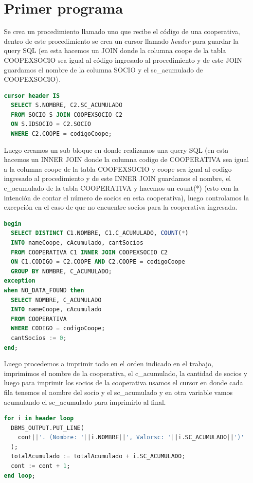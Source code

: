 \documentclass{article}
\begin{document}
\section{Primer programa}

    Se crea un procedimiento llamado uno que recibe el código de una cooperativa, dentro de este procedimiento se crea un cursor llamado \emph{header} para guardar la query SQL (en esta hacemos un JOIN donde la columna coope de la tabla COOPEXSOCIO sea igual al código ingresado al procedimiento y de este JOIN guardamos el nombre de la columna SOCIO y el sc\_acumulado de COOPEXSOCIO).

\begin{lstlisting}[language=SQL,label={lst:lstlisting10}]
cursor header IS
  SELECT S.NOMBRE, C2.SC_ACUMULADO
  FROM SOCIO S JOIN COOPEXSOCIO C2
  ON S.IDSOCIO = C2.SOCIO
  WHERE C2.COOPE = codigoCoope;\end{lstlisting}

  Luego creamos un sub bloque en donde realizamos una query SQL (en esta hacemos un INNER JOIN donde la columna codigo de COOPERATIVA sea igual a la columna coope de la tabla COOPEXSOCIO y coope sea igual al codigo ingresado al procedimiento y de este INNER JOIN guardamos el nombre, el c\_acumulado de la tabla COOPERATIVA y hacemos un count(*) (esto con la intención de contar el número de socios en esta cooperativa), luego controlamos la excepción en el caso de que no encuentre socios para la cooperativa ingresada.

\begin{lstlisting}[language=SQL,label={lst:lstlisting11}]
begin
  SELECT DISTINCT C1.NOMBRE, C1.C_ACUMULADO, COUNT(*)
  INTO nameCoope, cAcumulado, cantSocios
  FROM COOPERATIVA C1 INNER JOIN COOPEXSOCIO C2
  ON C1.CODIGO = C2.COOPE AND C2.COOPE = codigoCoope
  GROUP BY NOMBRE, C_ACUMULADO;
exception
when NO_DATA_FOUND then
  SELECT NOMBRE, C_ACUMULADO
  INTO nameCoope, cAcumulado
  FROM COOPERATIVA
  WHERE CODIGO = codigoCoope;
  cantSocios := 0;
end;\end{lstlisting}

Luego procedemos a imprimir todo en el orden indicado en el trabajo, imprimimos el nombre de la cooperativa, el c\_acumulado, la cantidad de socios y luego para imprimir los socios de la cooperativa usamos el cursor en donde cada fila tenemos el nombre del socio y el sc\_acumulado y en otra variable vamos acumulando el sc\_acumulado para imprimirlo al final.

\begin{lstlisting}[language=SQL,label={lst:lstlisting12}]
for i in header loop
  DBMS_OUTPUT.PUT_LINE(
    cont||'. (Nombre: '||i.NOMBRE||', Valorsc: '||i.SC_ACUMULADO||')'
  );
  totalAcumulado := totalAcumulado + i.SC_ACUMULADO;
  cont := cont + 1;
end loop;
\end{lstlisting}
\end{document}
